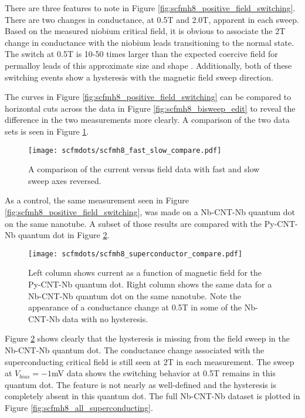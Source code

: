 There are three features to note in Figure \ref{fig:scfmh8_positive_field_switching}. There are two changes in conductance, at 0.5T and 2.0T, apparent in each sweep. Based on the measured niobium critical field, it is obvious to associate the 2T change in conductance with the niobium leads transitioning to the normal state. The switch at 0.5T is 10-50 times larger than the expected coercive field for permalloy leads of this approximate size and shape \cite{Aurich2010, Preusche2009}. Additionally, both of these switching events show a hysteresis with the magnetic field sweep direction. 

The curves in Figure \ref{fig:scfmh8_positive_field_switching} can be compared to horizontal cuts across the data in Figure \ref{fig:scfmh8_bisweep_edit} to reveal the difference in the two measurements more clearly. A comparison of the two data sets is seen in Figure \ref{fig:scfmh8_fast_slow_compare}. 

\begin{figure}
    \centering
    \texttt{[image: scfmdots/scfmh8\_fast\_slow\_compare.pdf]}
    \caption{A comparison of the current versus field data with fast and slow sweep axes reversed.}
    \label{fig:scfmh8_fast_slow_compare}
\end{figure}

As a control, the same measurement seen in Figure \ref{fig:scfmh8_positive_field_switching},  was made on a Nb-CNT-Nb quantum dot on the same nanotube. A subset of those results are compared with the Py-CNT-Nb quantum dot in Figure \ref{fig:scfmh8_superconductor_compare}.

\begin{figure}
    \centering
    \texttt{[image: scfmdots/scfmh8\_superconductor\_compare.pdf]}
    \caption{Left column shows current as a function of magnetic field for the Py-CNT-Nb quantum dot. Right column shows the same data for a Nb-CNT-Nb quantum dot on the same nanotube. Note the appearance of a conductance change at 0.5T in some of the Nb-CNT-Nb data with no hysteresis.}
    \label{fig:scfmh8_superconductor_compare}
\end{figure}

Figure \ref{fig:scfmh8_superconductor_compare} shows clearly that the hysteresis is missing from the field sweep in the Nb-CNT-Nb quantum dot. The conductance change associated with the superconducting critical field is still seen at 2T in each measurement. The sweep at $V_{bias}=-1$mV data shows the switching behavior at 0.5T remains in this quantum dot. The feature is not nearly as well-defined and the hysteresis is completely absent in this quantum dot. The full Nb-CNT-Nb dataset is plotted in Figure \ref{fig:scfmh8_all_superconducting}. 

